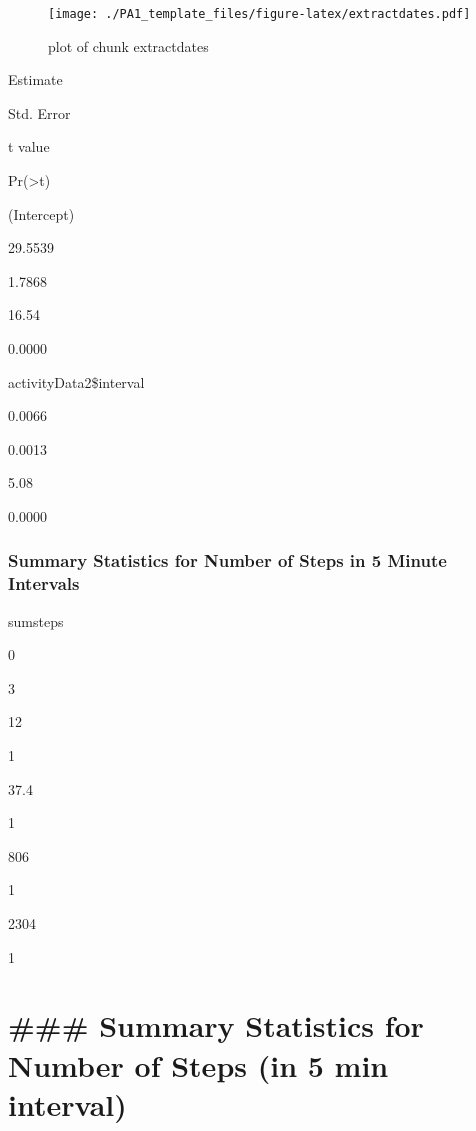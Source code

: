 \documentclass[]{article}
\newenvironment{Shaded}{\begin{snugshade}}{\end{snugshade}}
\newcommand{\KeywordTok}[1]{\textcolor[rgb]{0.13,0.29,0.53}{\textbf{{#1}}}}
\newcommand{\DataTypeTok}[1]{\textcolor[rgb]{0.13,0.29,0.53}{{#1}}}
\newcommand{\DecValTok}[1]{\textcolor[rgb]{0.00,0.00,0.81}{{#1}}}
\newcommand{\StringTok}[1]{\textcolor[rgb]{0.31,0.60,0.02}{{#1}}}
\newcommand{\NormalTok}[1]{{#1}}
\begin{document}
\begin{Shaded}
\end{Shaded}

\begin{figure}[htbp]
\centering
\texttt{[image: ./PA1\_template\_files/figure-latex/extractdates.pdf]}
\caption{plot of chunk extractdates}
\end{figure}

Estimate

Std. Error

t value

Pr(\textgreater{}\textbar{}t\textbar{})

(Intercept)

29.5539

1.7868

16.54

0.0000

activityData2\$interval

0.0066

0.0013

5.08

0.0000

\subsubsection{Summary Statistics for Number of Steps in 5 Minute
Intervals}\label{summary-statistics-for-number-of-steps-in-5-minute-intervals}

sumsteps

0

3

12

1

37.4

1

806

1

2304

1

\section{\#\#\# Summary Statistics for Number of Steps (in 5 min
interval)}\label{summary-statistics-for-number-of-steps-in-5-min-interval}
\end{document}
